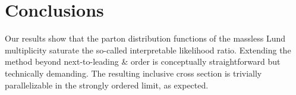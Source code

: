 \section{Conclusions}\label{sec:conclusions}

Our results show that the parton distribution functions of the massless
Lund multiplicity saturate the so-called interpretable likelihood ratio.
Extending the method beyond next-to-leading & order is conceptually
straightforward but technically demanding. The resulting inclusive cross
section is trivially parallelizable in the strongly ordered limit, as
expected.

